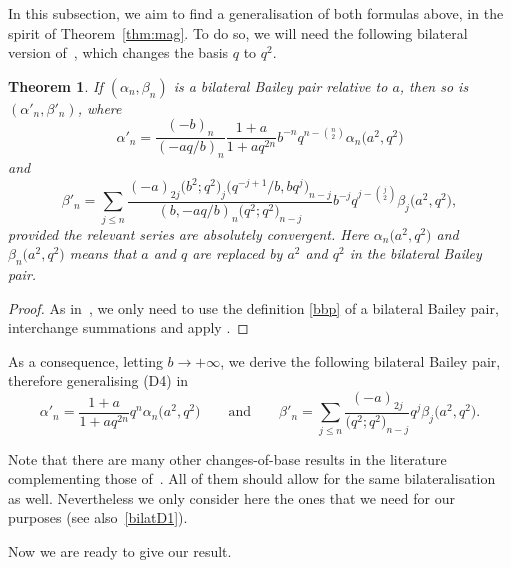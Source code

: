 \documentclass[pdftex]{sigma}
\numberwithin{equation}{section}
\newtheorem{Theorem}{Theorem}[section]
\begin{document}
In this subsection, we aim to find a generalisation of both formulas above, in the spirit of Theorem~\ref{thm:mag}. To do so, we will need the following bilateral version of~\cite[Theorem 2.5]{BIS}, which changes the basis $q$ to $q^2$.
\begin{Theorem}
If $(\alpha_n, \beta_n)$ is a bilateral Bailey pair relative to $a$, then so is $(\alpha'_n, \beta'_n)$, where
\begin{equation*}\alpha'_n=\frac{(-b)_n}{(-aq/b)_n}\frac{1+a}{1+aq^{2n}}b^{-n}q^{n-\binom{n}{2}}\alpha_n\bigl(a^2,q^2\bigr)
\end{equation*}
and
\begin{equation*}\beta'_n=\sum_{j\leq n}\frac{(-a)_{2j}\bigl(b^2;q^2\bigr)_j\bigl(q^{-j+1}/b,bq^{j}\bigr)_{n-j}}{(b,-aq/b)_n\bigl(q^2;q^2\bigr)_{n-j}}b^{-j}q^{j-\binom{j}{2}}\beta_j\bigl(a^2,q^2\bigr),
\end{equation*}
provided the relevant series are absolutely convergent. Here $\alpha_n\bigl(a^2,q^2\bigr)$ and $\beta_n\bigl(a^2,q^2\bigr)$ means that $a$ and $q$ are replaced by $a^2$ and $q^2$ in the bilateral Bailey pair.
\end{Theorem}

\begin{proof}
As in~\cite{BIS}, we only need to use the definition \eqref{bbp} of a bilateral Bailey pair, interchange summations and apply \cite[formula~(2.2)]{BIS}.
\end{proof}
As a consequence, letting $b\to+\infty$, we derive the following bilateral Bailey pair, therefore generalising (D4) in~\cite{BIS}
\begin{equation}\label{bilatD4}
\alpha'_n=\frac{1+a}{1+aq^{2n}}q^n\alpha_n\bigl(a^2,q^2\bigr)\qquad\mbox{and}\qquad\beta'_n=\sum_{j\leq n}\frac{(-a)_{2j}}{\bigl(q^2;q^2\bigr)_{n-j}}q^{j}\beta_j\bigl(a^2,q^2\bigr).
\end{equation}

Note that there are many other changes-of-base results in the literature complementing those of~\cite{BIS}. All of them should allow for the same bilateralisation as well. Nevertheless we only consider here the ones that we need for our purposes (see also~\eqref{bilatD1}).

Now we are ready to give our result.
\end{document}
